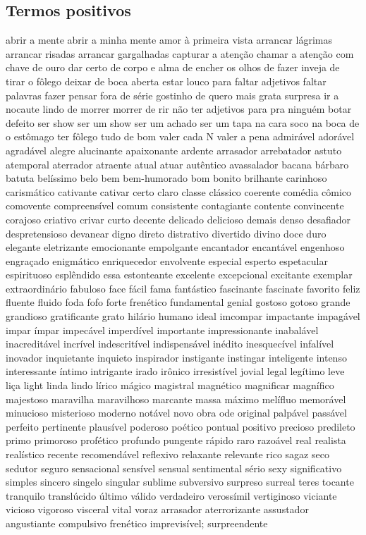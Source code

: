 \documentclass[ruledheader]{abnt_UFF}
\begin{document}
\subsection{Termos positivos}
abrir a mente abrir a minha mente amor \`{a} primeira vista arrancar l\'{a}grimas arrancar risadas arrancar gargalhadas capturar a aten\c{c}\~ao chamar a aten\c{c}\~ao com chave de ouro dar certo de corpo e alma de encher os olhos de fazer inveja de tirar o f\^{o}lego deixar de boca aberta estar louco para faltar adjetivos faltar palavras fazer pensar fora de s\'{e}rie gostinho de quero mais grata surpresa ir a nocaute lindo de morrer morrer de rir n\~ao ter adjetivos para pra ningu\'{e}m botar defeito ser show ser um show ser um achado ser um tapa na cara soco na boca de o est\^{o}mago ter f\^{o}lego tudo de bom valer cada N valer a pena admir\'{a}vel ador\'{a}vel agrad\'{a}vel alegre alucinante apaixonante ardente arrasador arrebatador astuto atemporal aterrador atraente atual atuar aut\^{e}ntico avassalador bacana b\'{a}rbaro batuta bel\'{i}ssimo belo bem bem-humorado bom bonito brilhante carinhoso carism\'{a}tico cativante cativar certo claro classe cl\'{a}ssico coerente com\'{e}dia c\^{o}mico comovente compreens\'{i}vel comum consistente contagiante contente convincente corajoso criativo crivar curto decente delicado delicioso demais denso desafiador despretensioso devanear digno direto distrativo divertido divino doce duro elegante eletrizante emocionante empolgante encantador encant\'{a}vel engenhoso engra\c{c}ado enigm\'{a}tico enriquecedor envolvente especial esperto espetacular espirituoso espl\^{e}ndido essa estonteante excelente excepcional excitante exemplar extraordin\'{a}rio fabuloso face f\'{a}cil fama fant\'{a}stico fascinante fascinate favorito feliz fluente fluido foda fofo forte fren\'{e}tico fundamental genial gostoso gotoso grande grandioso gratificante grato hil\'{a}rio humano ideal imcompar impactante impag\'{a}vel impar \'{i}mpar impec\'{a}vel imperd\'{i}vel importante impressionante inabal\'{a}vel inacredit\'{a}vel incr\'{i}vel indescrit\'{i}vel indispens\'{a}vel in\'{e}dito inesquec\'{i}vel infal\'{i}vel inovador inquietante inquieto inspirador instigante instingar inteligente intenso interessante \'{i}ntimo intrigante irado ir\^{o}nico irresist\'{i}vel jovial legal leg\'{i}timo leve li\c{c}a light linda lindo l\'{i}rico m\'{a}gico magistral magn\'{e}tico magnificar magn\'{i}fico majestoso maravilha maravilhoso marcante massa m\'{a}ximo mel\'{i}fluo memor\'{a}vel minucioso misterioso moderno not\'{a}vel novo obra ode original palp\'{a}vel pass\'{a}vel perfeito pertinente plaus\'{i}vel poderoso po\'{e}tico pontual positivo precioso predileto primo primoroso prof\'{e}tico profundo pungente r\'{a}pido raro razo\'{a}vel real realista real\'{i}stico recente recomend\'{a}vel reflexivo relaxante relevante rico sagaz seco sedutor seguro sensacional sens\'{i}vel sensual sentimental s\'{e}rio sexy significativo simples sincero singelo singular sublime subversivo surpreso surreal teres tocante tranquilo transl\'{u}cido \'{u}ltimo v\'{a}lido verdadeiro veross\'{i}mil vertiginoso viciante vicioso vigoroso visceral vital voraz arrasador aterrorizante assustador angustiante compulsivo fren\'{e}tico imprevis\'{i}vel; surpreendente 
\end{document}
